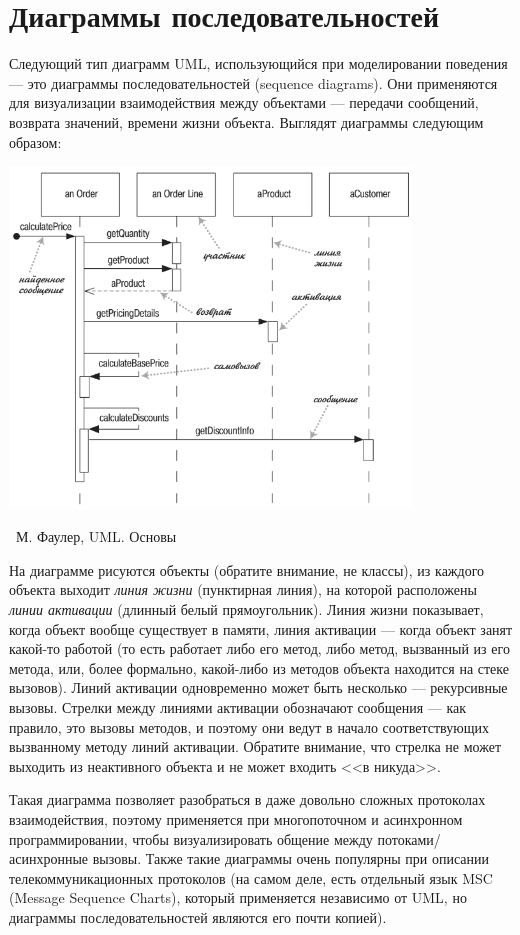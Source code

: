 \documentclass[a5paper]{article}
\newcommand{\attribution}[1] {
	\vspace{-5mm}\begin{flushright}\begin{scriptsize}%
	{\textcopyright\, #1}\end{scriptsize}\end{flushright}
}
\begin{document}
\section{Диаграммы последовательностей}

Следующий тип диаграмм UML, использующийся при моделировании поведения --- это диаграммы последовательностей (sequence diagrams). Они применяются для визуализации взаимодействия между объектами --- передачи сообщений, возврата значений, времени жизни объекта. Выглядят диаграммы следующим образом:

\begin{center}
	\includegraphics[width=0.8\textwidth]{sequenceDiagramSyntax.png}
	\attribution{М. Фаулер, UML. Основы}
\end{center}

На диаграмме рисуются объекты (обратите внимание, не классы), из каждого объекта выходит \textit{линия жизни} (пунктирная линия), на которой расположены \textit{линии активации} (длинный белый прямоугольник). Линия жизни показывает, когда объект вообще существует в памяти, линия активации --- когда объект занят какой-то работой (то есть работает либо его метод, либо метод, вызванный из его метода, или, более формально, какой-либо из методов объекта находится на стеке вызовов). Линий активации одновременно может быть несколько --- рекурсивные вызовы. Стрелки между линиями активации обозначают сообщения --- как правило, это вызовы методов, и поэтому они ведут в начало соответствующих вызванному методу линий активации. Обратите внимание, что стрелка не может выходить из неактивного объекта и не может входить <<в никуда>>.

Такая диаграмма позволяет разобраться в даже довольно сложных протоколах взаимодействия, поэтому применяется при многопоточном и асинхронном программировании, чтобы визуализировать общение между потоками/асинхронные вызовы. Также такие диаграммы очень популярны при описании телекоммуникационных протоколов (на самом деле, есть отдельный язык MSC (Message Sequence Charts), который применяется независимо от UML, но диаграммы последовательностей являются его почти копией).
\end{document}
